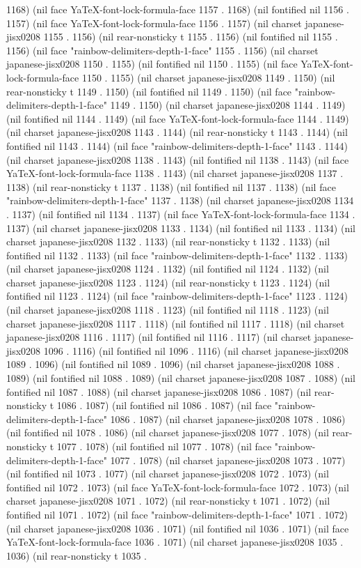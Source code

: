 1168) (nil face YaTeX-font-lock-formula-face 1157 . 1168) (nil fontified nil 1156 . 1157) (nil face YaTeX-font-lock-formula-face 1156 . 1157) (nil charset japanese-jisx0208 1155 . 1156) (nil rear-nonsticky t 1155 . 1156) (nil fontified nil 1155 . 1156) (nil face "rainbow-delimiters-depth-1-face" 1155 . 1156) (nil charset japanese-jisx0208 1150 . 1155) (nil fontified nil 1150 . 1155) (nil face YaTeX-font-lock-formula-face 1150 . 1155) (nil charset japanese-jisx0208 1149 . 1150) (nil rear-nonsticky t 1149 . 1150) (nil fontified nil 1149 . 1150) (nil face "rainbow-delimiters-depth-1-face" 1149 . 1150) (nil charset japanese-jisx0208 1144 . 1149) (nil fontified nil 1144 . 1149) (nil face YaTeX-font-lock-formula-face 1144 . 1149) (nil charset japanese-jisx0208 1143 . 1144) (nil rear-nonsticky t 1143 . 1144) (nil fontified nil 1143 . 1144) (nil face "rainbow-delimiters-depth-1-face" 1143 . 1144) (nil charset japanese-jisx0208 1138 . 1143) (nil fontified nil 1138 . 1143) (nil face YaTeX-font-lock-formula-face 1138 . 1143) (nil charset japanese-jisx0208 1137 . 1138) (nil rear-nonsticky t 1137 . 1138) (nil fontified nil 1137 . 1138) (nil face "rainbow-delimiters-depth-1-face" 1137 . 1138) (nil charset japanese-jisx0208 1134 . 1137) (nil fontified nil 1134 . 1137) (nil face YaTeX-font-lock-formula-face 1134 . 1137) (nil charset japanese-jisx0208 1133 . 1134) (nil fontified nil 1133 . 1134) (nil charset japanese-jisx0208 1132 . 1133) (nil rear-nonsticky t 1132 . 1133) (nil fontified nil 1132 . 1133) (nil face "rainbow-delimiters-depth-1-face" 1132 . 1133) (nil charset japanese-jisx0208 1124 . 1132) (nil fontified nil 1124 . 1132) (nil charset japanese-jisx0208 1123 . 1124) (nil rear-nonsticky t 1123 . 1124) (nil fontified nil 1123 . 1124) (nil face "rainbow-delimiters-depth-1-face" 1123 . 1124) (nil charset japanese-jisx0208 1118 . 1123) (nil fontified nil 1118 . 1123) (nil charset japanese-jisx0208 1117 . 1118) (nil fontified nil 1117 . 1118) (nil charset japanese-jisx0208 1116 . 1117) (nil fontified nil 1116 . 1117) (nil charset japanese-jisx0208 1096 . 1116) (nil fontified nil 1096 . 1116) (nil charset japanese-jisx0208 1089 . 1096) (nil fontified nil 1089 . 1096) (nil charset japanese-jisx0208 1088 . 1089) (nil fontified nil 1088 . 1089) (nil charset japanese-jisx0208 1087 . 1088) (nil fontified nil 1087 . 1088) (nil charset japanese-jisx0208 1086 . 1087) (nil rear-nonsticky t 1086 . 1087) (nil fontified nil 1086 . 1087) (nil face "rainbow-delimiters-depth-1-face" 1086 . 1087) (nil charset japanese-jisx0208 1078 . 1086) (nil fontified nil 1078 . 1086) (nil charset japanese-jisx0208 1077 . 1078) (nil rear-nonsticky t 1077 . 1078) (nil fontified nil 1077 . 1078) (nil face "rainbow-delimiters-depth-1-face" 1077 . 1078) (nil charset japanese-jisx0208 1073 . 1077) (nil fontified nil 1073 . 1077) (nil charset japanese-jisx0208 1072 . 1073) (nil fontified nil 1072 . 1073) (nil face YaTeX-font-lock-formula-face 1072 . 1073) (nil charset japanese-jisx0208 1071 . 1072) (nil rear-nonsticky t 1071 . 1072) (nil fontified nil 1071 . 1072) (nil face "rainbow-delimiters-depth-1-face" 1071 . 1072) (nil charset japanese-jisx0208 1036 . 1071) (nil fontified nil 1036 . 1071) (nil face YaTeX-font-lock-formula-face 1036 . 1071) (nil charset japanese-jisx0208 1035 . 1036) (nil rear-nonsticky t 1035 . 